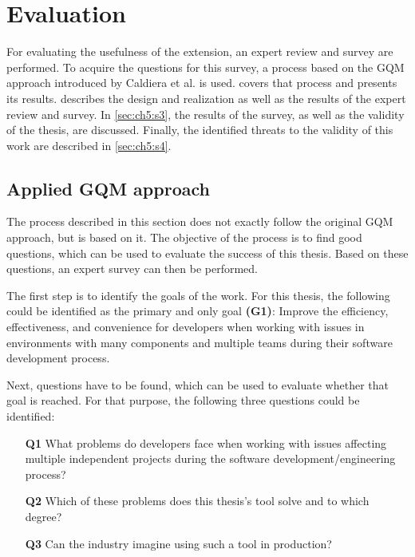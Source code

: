 
\chapter{Evaluation}
\label{chap:ch5}
For evaluating the usefulness of the extension, an expert review and survey are performed.
To acquire the questions for this survey, a process based on the \gls{GQM} approach introduced by Caldiera et al. \cite{caldiera1994goal} is used.
 covers that process and presents its results.
 describes the design and realization as well as the results of the expert review and survey.
In \cref{sec:ch5:s3}, the results of the survey, as well as the validity of the thesis, are discussed.
Finally, the identified threats to the validity of this work are described in \cref{sec:ch5:s4}.

\section{Applied \acrfull{GQM} approach}
\label{sec:ch5:s1}
The process described in this section does not exactly follow the original \acrfull{GQM} approach,
but is based on it.
The objective of the process is to find good questions, which can be used to evaluate the success of this thesis.
Based on these questions, an expert survey can then be performed.

The first step is to identify the goals of the work.
For this thesis, the following could be identified as the primary and only goal \textbf{(G1)}:
Improve the efficiency, effectiveness, and convenience for developers when working with issues in environments with many components and multiple teams during their software development process. 

Next, questions have to be found, which can be used to evaluate whether that goal is reached.
For that purpose, the following three questions could be identified:
\begin{itemize}
	\item[\textbf{Q1}] What problems do developers face when working with issues affecting multiple independent projects during the software development/engineering process?
	\item[\textbf{Q2}] Which of these problems does this thesis's tool solve and to which degree?
	\item[\textbf{Q3}] Can the industry imagine using such a tool in production?
\end{itemize}

